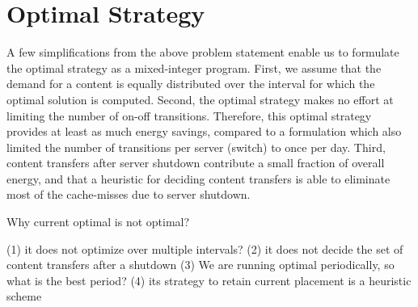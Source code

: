 \appendix
\section{Optimal Strategy}
\label{sec:optimal}

A few simplifications from the above problem statement enable us to formulate the optimal strategy as a mixed-integer program. First, we assume that the demand for a content is equally distributed  over the interval for which the optimal solution is computed. Second, the optimal strategy makes no effort at limiting the number of on-off transitions. Therefore, this optimal strategy provides at least as much energy savings, compared to a formulation which also limited the number of transitions per server (switch)  to once per day. Third, content transfers after server shutdown contribute a small fraction of overall energy, and that a heuristic for deciding content transfers is able to eliminate most of the cache-misses due to server shutdown. 

%

Why current optimal is not optimal?

(1) it does not optimize over multiple intervals?
(2) it does not decide the set of content transfers after a shutdown
(3) We are running optimal periodically, so what is the best period?
(4) its strategy to retain current placement is a heuristic scheme





